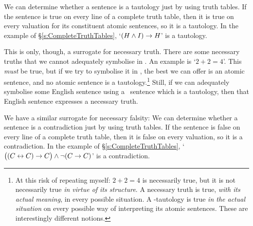 We can determine whether a sentence is a tautology just by using truth tables. If the sentence is true on every line of a complete truth table, then it is true on every valuation for its constituent atomic sentences, so it is a tautology. In the example of §\ref{s:CompleteTruthTables}, `$(H \wedge I) \rightarrow H$' is a tautology. 



This is only, though, a surrogate for necessary truth. There are some necessary truths that we cannot adequately symbolise in \TFL. An example is `$2 + 2 = 4$'. This \emph{must} be true, but if we try to symbolise it in \TFL, the best we can offer is an atomic sentence, and no atomic sentence is a tautology.\footnote{At this risk of repeating myself: $2+2=4$ is necessarily true, but it is not necessarily true \emph{in virtue of its structure}. A necessary truth is true, \emph{with its actual meaning}, in every possible situation. A \TFL-tautology is true \emph{in the actual situation} on every possible way of interpreting its atomic sentences. These are interestingly different notions.} Still, if we can adequately symbolise some English sentence using a \TFL\ sentence which is a tautology, then that English sentence expresses a necessary truth.

We have a similar surrogate for necessary falsity:
We can determine whether a sentence is a contradiction just by using truth tables. If the sentence is false on every line of a complete truth table, then it is false on every valuation, so it is a contradiction. In the example of §\ref{s:CompleteTruthTables}, `$\bigl( (C\leftrightarrow C) \rightarrow C\bigr)  \wedge \neg(C \rightarrow C)$' is a contradiction.


